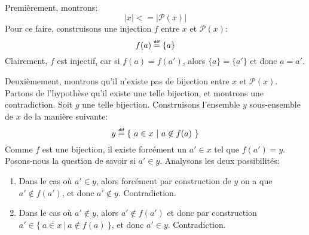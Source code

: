\documentclass[12pt,french,a4paper]{article}
\newcommand\eqdef{\mathrel{\overset{\makebox[0pt]{\mbox{\normalfont\tiny\sffamily déf}}}{=}}}
\begin{document}
\begin{question}
Premièrement, montrons:
\[
|x| <= |\mathcal{P}(x)|
\]
Pour ce faire, construisons une injection $f$ entre $x$ et $\mathcal{P}(x)$:
\[
f(a) \eqdef \{ a \}
\]
Clairement, $f$ est injectif, car si $f(a) = f(a')$, alors $\{ a \} = \{ a' \}$ et donc $a = a'$.

Deuxièmement, montrons qu'il n'existe pas de bijection entre $x$ et $\mathcal{P}(x)$.
Partons de l'hypothèse qu'il existe une telle bijection, et montrons une contradiction.
Soit $g$ une telle bijection.
Construisons l'ensemble $y$ sous-ensemble de $x$ de la manière suivante:
\[
y \eqdef \{\ a \in x\ |\ a \not\in f(a)\ \}
\]
Comme $f$ est une bijection, il existe forcément un $a' \in x$ tel que $f(a') = y$. Posons-nous la question de savoir si $a' \in y$.
Analysons les deux possibilités:
\begin{enumerate}
\item
Dans le cas où $a' \in y$, alors forcément par construction de $y$ on a que $a' \not\in f(a')$, et donc $a' \not\in y$. Contradiction.
\item
Dans le cas où $a' \not\in y$, alors $a' \not\in f(a')$ et donc par construction $a' \in \{\ a \in x\ |\ a \not\in f(a)\ \}$, et donc $a' \in y$. Contradiction.
\end{enumerate}

\end{question}
\end{document}
